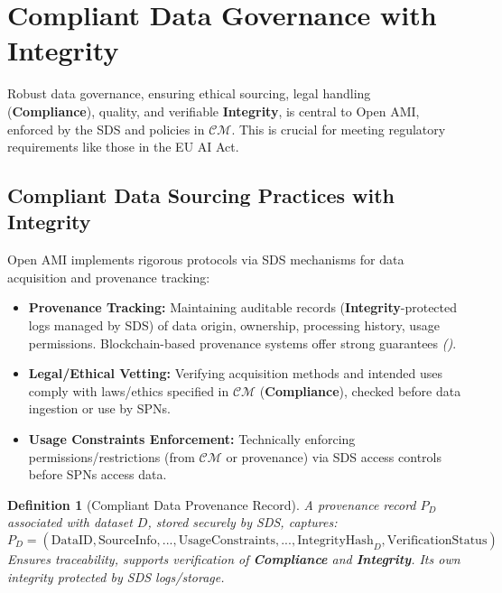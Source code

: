 \documentclass[12pt,a4paper]{report}
\renewcommand{\citep}[1]{\textit{\scriptsize{(\cite{#1})}}}
\newtheorem{definition}{Definition}[section]
\newcommand{\Integrity}{\textbf{Integrity}}
\begin{document}
	\section{Compliant Data Governance with Integrity} %
	\label{sec:5-5} %
	
	Robust data governance, ensuring ethical sourcing, legal handling (\textbf{Compliance}), quality, and verifiable \Integrity, is central to Open AMI, enforced by the SDS and policies in $\mathcal{CM}$. This is crucial for meeting regulatory requirements like those in the EU AI Act.
	
	\subsection{Compliant Data Sourcing Practices with Integrity} %
	\label{sec:5-5-1} %
	
	Open AMI implements rigorous protocols via SDS mechanisms for data acquisition and provenance tracking:
	\begin{itemize}
		\item \textbf{Provenance Tracking:} Maintaining auditable records (\Integrity-protected logs managed by SDS) of data origin, ownership, processing history, usage permissions. Blockchain-based provenance systems offer strong guarantees \citep{ProML_Provenance_2022}.
		\item \textbf{Legal/Ethical Vetting:} Verifying acquisition methods and intended uses comply with laws/ethics specified in $\mathcal{CM}$ (\textbf{Compliance}), checked before data ingestion or use by SPNs.
		\item \textbf{Usage Constraints Enforcement:} Technically enforcing permissions/restrictions (from $\mathcal{CM}$ or provenance) via SDS access controls before SPNs access data.
	\end{itemize}
	
	\begin{definition}[Compliant Data Provenance Record]
		\label{def:legal-provenance-compliance}
		A provenance record $P_D$ associated with dataset $D$, stored securely by SDS, captures:
		$P_D = (\text{DataID}, \text{SourceInfo}, ..., \text{UsageConstraints}, ..., \text{IntegrityHash}_D, \text{VerificationStatus})$
		Ensures traceability, supports verification of \textbf{Compliance} and \Integrity. Its own integrity protected by SDS logs/storage.
	\end{definition}
	
\end{document}

